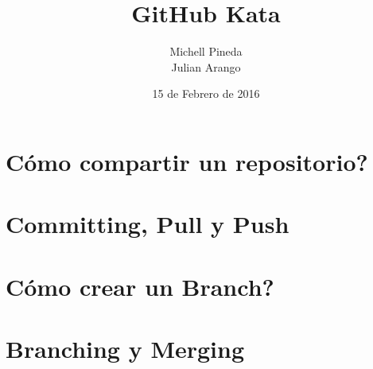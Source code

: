 \documentclass{beamer}
\begin{document}
    \title{GitHub Kata}
    \author{Michell Pineda \\ 
            Julian Arango}
    \date{15 de Febrero de 2016}
    \frame{ \titlepage }

    
    
    
    
    
    
    
    \section{C\'omo compartir un repositorio?}
    
    \section{Committing, Pull y Push}
    
    
    
    \section{C\'omo crear un Branch?}
    
    \section{Branching y Merging}
    
\end{document}
